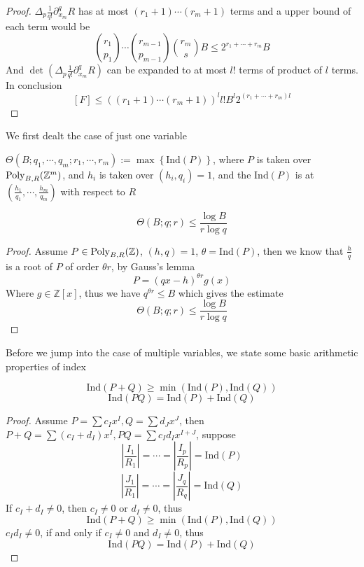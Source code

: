 \begin{proof}
$ \Delta_{p}\frac{1}{q!}\partial_{x_{m}}^{q} R $ has at most $ (r_{1}+1)\cdots(r_{m}+1) $ terms and a upper bound of each term would be 
$$ \binom{r_{1}}{p_{1}}\cdots\binom{r_{m-1}}{p_{m-1}}\binom{r_{m}}{s}B \leq 2^{r_{1}+\cdots+r_{m}}B $$
And $ \det\left( \Delta_{p}\frac{1}{q!}\partial_{x_{m}}^{q} R \right) $ can be expanded to at most $ l! $ terms of product of $ l $ terms. In conclusion
$$ [F] \leq \left( (r_{1}+1)\cdots(r_{m}+1) \right)^{l}l!B^{l}2^{(r_{1}+\cdots+r_{m})l} $$
\end{proof}

We first dealt the case of just one variable

\begin{definition}\label{definition 38}
$ \Theta(B;q_{1},\cdots,q_{m};r_{1},\cdots,r_{m}) := \max \left\{ \mathrm{Ind}(P) \right\} $, where $ P $ is taken over $ \operatorname{Poly}_{B,R}(\mathbb{Z}^{m}) $, and $ h_{i} $ is taken over $ (h_{i},q_{i})=1 $, and the $ \mathrm{Ind}(P) $ is at $ \left( \frac{h_{1}}{q_{1}},\cdots,\frac{h_{m}}{q_{m}} \right) $ with respect to $ R $
\end{definition}

\begin{lemma}\label{lemma 39}
$$ \Theta(B;q;r) \leq \dfrac{\log B}{r\log q} $$
\end{lemma}

\begin{proof}
Assume $ P \in \operatorname{Poly}_{B,R}(\mathbb{Z}) $, $ (h,q)=1 $, $ \theta=\mathrm{Ind}(P) $, then we know that 
$ \frac{h}{q} $ is a root of $ P $ of order $ \theta r $, by Gauss's lemma
$$ P = (qx-h)^{\theta r}g(x) $$
Where $ g \in \mathbb{Z}[x] $, thus we have $ q^{\theta r} \leq B $ which gives the estimate
$$ \Theta(B;q;r) \leq \dfrac{\log B}{r\log q} $$
\end{proof}

Before we jump into the case of multiple variables, we state some basic arithmetic properties of index

\begin{lemma}\label{lemma 40}
$$ \mathrm{Ind}(P+Q) \geq \min\left(\mathrm{Ind}(P),\mathrm{Ind}(Q)\right) $$
$$ \mathrm{Ind}(PQ) = \mathrm{Ind}(P)+\mathrm{Ind}(Q) $$
\end{lemma}

\begin{proof}
Assume $ P = \sum c_{I}x^{I}, Q = \sum d_{J}x^{J} $, then $ P+Q = \sum (c_{I}+d_{I})x^{I}, PQ = \sum c_{I}d_{I}x^{I+J} $, suppose
$$ \left| \dfrac{I_{1}}{R_{1}} \right| = \cdots = \left| \dfrac{I_{p}}{R_{p}} \right| = \mathrm{Ind}(P) $$
$$ \left| \dfrac{J_{1}}{R_{1}} \right| = \cdots = \left| \dfrac{J_{q}}{R_{q}} \right| = \mathrm{Ind}(Q) $$
If $ c_{I}+d_{I} \neq 0 $, then $ c_{I} \neq 0 $ or $ d_{I} \neq 0 $, thus
$$ \mathrm{Ind}(P+Q) \geq \min\left(\mathrm{Ind}(P),\mathrm{Ind}(Q)\right) $$
$ c_{I}d_{I} \neq 0 $, if and only if $ c_{I} \neq 0 $ and $ d_{I} \neq 0 $, thus
$$ \mathrm{Ind}(PQ) = \mathrm{Ind}(P)+\mathrm{Ind}(Q) $$
\end{proof}

